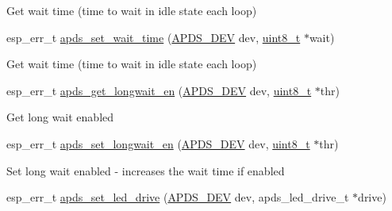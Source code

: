 \begin{DoxyCompactItemize}
\begin{DoxyCompactList}
\begin{DoxyItemize}
\item Get wait time (time to wait in idle state each loop) 
\end{DoxyItemize}\end{DoxyCompactList}\item 
esp\+\_\+err\+\_\+t \hyperlink{group__APDS9960__GeneralFunctions_gabf6c5a724f584dd63d25871845c899ea}{apds\+\_\+set\+\_\+wait\+\_\+time} (\hyperlink{structAPDS9960__Driver}{A\+P\+D\+S\+\_\+\+D\+EV} dev, \hyperlink{vl53l0x__types_8h_aba7bc1797add20fe3efdf37ced1182c5}{uint8\+\_\+t} $\ast$wait)
\begin{DoxyCompactList}\small\item\em 
\begin{DoxyItemize}
\item Get wait time (time to wait in idle state each loop) 
\end{DoxyItemize}\end{DoxyCompactList}\item 
esp\+\_\+err\+\_\+t \hyperlink{group__APDS9960__GeneralFunctions_ga98dd5b276349b3c1acd1b8c18eed1c10}{apds\+\_\+get\+\_\+longwait\+\_\+en} (\hyperlink{structAPDS9960__Driver}{A\+P\+D\+S\+\_\+\+D\+EV} dev, \hyperlink{vl53l0x__types_8h_aba7bc1797add20fe3efdf37ced1182c5}{uint8\+\_\+t} $\ast$thr)
\begin{DoxyCompactList}\small\item\em 
\begin{DoxyItemize}
\item Get long wait enabled 
\end{DoxyItemize}\end{DoxyCompactList}\item 
esp\+\_\+err\+\_\+t \hyperlink{group__APDS9960__GeneralFunctions_ga70a986a664b7d7fa0d22a5df25b92950}{apds\+\_\+set\+\_\+longwait\+\_\+en} (\hyperlink{structAPDS9960__Driver}{A\+P\+D\+S\+\_\+\+D\+EV} dev, \hyperlink{vl53l0x__types_8h_aba7bc1797add20fe3efdf37ced1182c5}{uint8\+\_\+t} $\ast$thr)
\begin{DoxyCompactList}\small\item\em 
\begin{DoxyItemize}
\item Set long wait enabled -\/ increases the wait time if enabled 
\end{DoxyItemize}\end{DoxyCompactList}\item 
esp\+\_\+err\+\_\+t \hyperlink{group__APDS9960__GeneralFunctions_gac4250216ba09d463b8dba7d2231660e5}{apds\+\_\+set\+\_\+led\+\_\+drive} (\hyperlink{structAPDS9960__Driver}{A\+P\+D\+S\+\_\+\+D\+EV} dev, apds\+\_\+led\+\_\+drive\+\_\+t $\ast$drive)

\end{DoxyCompactItemize}
